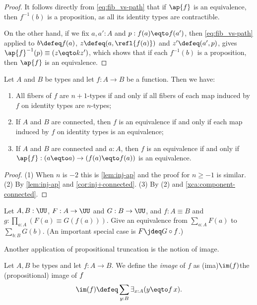 \begin{proof}
  It follows directly from \eqref{eq:fib_vs-path}
  that if $\ap{f}$ is an equivalence,
  then $f^{-1}(b)$ is a proposition,
  as all its identity types are contractible.

  On the other hand, if we fix $a,a':A$ and $p:f(a) \eqto f(a')$,
  then \eqref{eq:fib_vs-path} applied to $b \defeq f(a)$,
  $z \defeq (a,\refl{f(a)})$ and
  $z' \defeq (a',p)$,
  gives $\ap{f}^{-1}(p) \equiv (z \eqto kz')$,
  which shows that if each $f^{-1}(b)$ is a proposition,
  then $\ap{f}$ is an equivalence.
\end{proof}


\begin{corollary}\label{cor:fib-vs-path}
Let $A$ and $B$ be types and let $f:A\to B$ be a function. Then we have:
\begin{enumerate}
\item\label{set-fib-vs-path}
All fibers of $f$ are $n+1$-types if and only if all fibers of 
each map induced by $f$ on identity types are $n$-types;
\item\label{conn-fib-vs-path}
If $A$ and $B$ are connected, then $f$ is an equivalence
if and only if each map induced by $f$ on identity types is an equivalence;
\item\label{conn-fib-vs-path-point}
If $A$ and $B$ are connected and $a:A$, then $f$ is an equivalence
if and only if $\ap{f}: (a \eqto a) \to (f(a) \eqto f(a))$ is an equivalence.
\end{enumerate}
\end{corollary}
\begin{proof}
(1) When $n$ is $-2$ this is \cref{lem:inj-ap}
and the proof for $n\geq -1$ is similar.
(2) By \cref{lem:inj-ap} and \cref{cor:inj+connected}.
(3) By (2) and \cref{xca:component-connected}.
\end{proof}

\begin{xca}\label{xca:sum-equivalences}
Let $A,B:\UU$, $F:A\to\UU$ and $G:B\to\UU$,
and $f: A\equiv B$ and $g:\prod_{a:A}(F(a) \equiv G(f(a)))$.
Give an equivalence from $\sum_{a:A} F(a)$ to $\sum_{b:B} G(b)$.
(An important special case is $F\jdeq G\circ f$.)
\end{xca}

Another application of propositional truncation
is the notion of image.
\begin{definition}\label{def:prop-image}
  Let $A,B$ be types and let $f : A \to B$. We define the \emph{image} of $f$ as
  \glossary(ima){$\protect\im(f)$}{the (propositional) image of $\protect f$}
  \[
    \im(f) \defeq \sum_{y:B}\exists_{x:A}(y \eqto f\,x).\qedhere
  \]
\end{definition}

